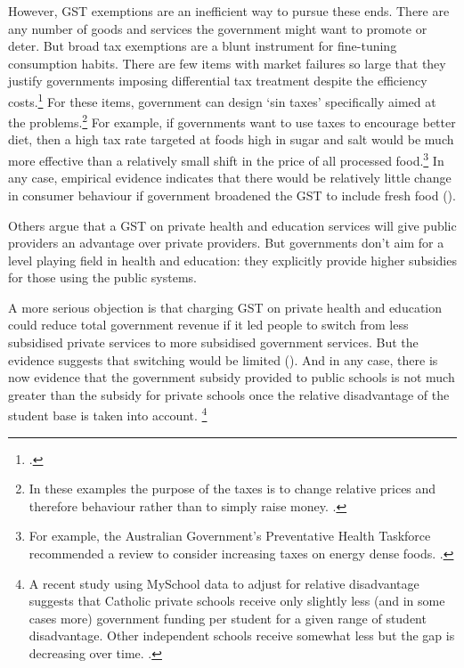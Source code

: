 However, GST exemptions are an inefficient way to pursue these ends. There are any number of goods and services the government might want to promote or deter. But broad tax exemptions are a blunt instrument for fine-tuning consumption habits. There are few items with market failures so large that they justify governments imposing differential tax treatment despite the efficiency costs.\footcite[][163]{MirrleesAdamBesleyEtAl2011}  For these items, government can design ‘sin taxes’ specifically aimed at the problems.\footnote{In these examples the purpose of the taxes is to change relative prices and therefore behaviour rather than to simply raise money. \textcites{MirrleesAdamBesleyEtAl2011}{HenryTaxReview2010}.}  For example, if governments want to use taxes to encourage better diet, then a high tax rate targeted at foods high in sugar and salt would be much more effective than a relatively small shift in the price of all processed food.\footnote{For example, the Australian Government’s Preventative Health Taskforce recommended a review to consider increasing taxes on energy dense foods. \textcite[][15]{Preventative-Taskforce2008-Australia-Healthiest-Country-by-2020}.}  In any case, empirical evidence indicates that there would be relatively little change in consumer behaviour if government broadened the GST to include fresh food ().

Others argue that a GST on private health and education services will give public providers an advantage over private providers. But governments don’t aim for a level playing field in health and education: they explicitly provide higher subsidies for those using the public systems. 

A more serious objection is that charging GST on private health and education could reduce total government revenue if it led people to switch from less subsidised private services to more subsidised government services. But the evidence suggests that switching would be limited (). And in any case, there is now evidence that the government subsidy provided to public schools is not much greater than the subsidy for private schools once the relative disadvantage of the student base is taken into account.%
\footnote{A recent study using MySchool data to adjust for relative disadvantage suggests that Catholic private schools receive only slightly less (and in some cases more) government funding per student for a given range of student disadvantage. Other independent schools receive somewhat less but the gap is decreasing over time. \textcite{BonnerSheperd2015}.}

